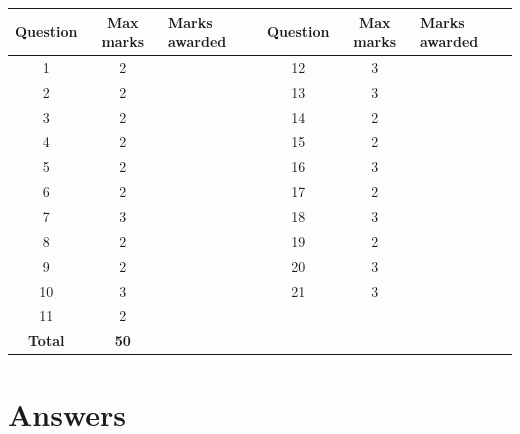 \documentclass[11pt,a4paper]{article}
\begin{document}
\vspace{6pt}
{\renewcommand{\arraystretch}{1.6}
\begin{tabular}{|c|c|p{3cm}|c|c|p{3cm}|}
\hline
\textbf{Question} & \textbf{Max marks} & \textbf{Marks awarded} & \textbf{Question} & \textbf{Max marks} & \textbf{Marks awarded} \\ \hline
1 & 2 & & 12 & 3 & \\ \hline
2 & 2 & & 13 & 3 & \\ \hline
3 & 2 & & 14 & 2 & \\ \hline
4 & 2 & & 15 & 2 & \\ \hline
5 & 2 & & 16 & 3 & \\ \hline
6 & 2 & & 17 & 2 & \\ \hline
7 & 3 & & 18 & 3 & \\ \hline
8 & 2 & & 19 & 2 & \\ \hline
9 & 2 & & 20 & 3 & \\ \hline
10 & 3 & & 21 & 3 & \\ \hline
11 & 2 & & & & \\ \hline
\textbf{Total} & \textbf{50} & & & & \\ \hline
\end{tabular}}

\newpage
\section*{Answers}
\end{document}
